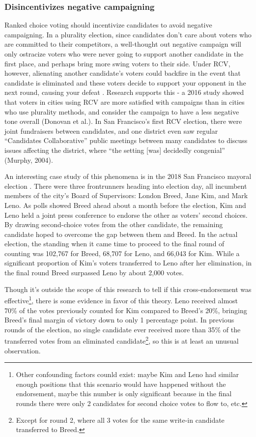 \documentclass[12pt,twoside]{reedthesis}
\theoremstyle{definition}
\theoremstyle{definition}
\theoremstyle{definition}
\theoremstyle{remark}
\begin{document}
\hypertarget{disincentivizes-negative-campaigning}{%
\subsubsection{Disincentivizes negative
campaigning}\label{disincentivizes-negative-campaigning}}

Ranked choice voting should incentivize candidates to avoid negative
campaigning. In a plurality election, since candidates don't care about
voters who are committed to their competitors, a well-thought out
negative campaign will only ostracize voters who were never going to
support another candidate in the first place, and perhaps bring more
swing voters to their side. Under RCV, however, alienating another
candidate's voters could backfire in the event that candidate is
eliminated and these voters decide to support your opponent in the next
round, causing your defeat . Research supports this - a 2016 study
showed that voters in cities using RCV are more satisfied with campaigns
than in cities who use plurality methods, and consider the campaign to
have a less negative tone overall (Donovan et al.). In San Francisco's
first RCV election, there were joint fundraisers between candidates, and
one district even saw regular ``Candidates Collaborative'' public
meetings between many candidates to discuss issues affecting the
district, where ``the setting {[}was{]} decidedly congenial'' (Murphy,
2004).

An interesting case study of this phenomena is in the 2018 San Francisco
mayoral election . There were three frontrunners heading into election
day, all incumbent members of the city's Board of Supervisors: London
Breed, Jane Kim, and Mark Leno. As polls showed Breed ahead about a
month before the election, Kim and Leno held a joint press conference to
endorse the other as voters' second choices. By drawing second-choice
votes from the other candidate, the remaining candidate hoped to
overcome the gap between them and Breed. In the actual election, the
standing when it came time to proceed to the final round of counting was
102,767 for Breed, 68,707 for Leno, and 66,043 for Kim. While a
significant proportion of Kim's voters transferred to Leno after her
elimination, in the final round Breed surpassed Leno by about 2,000
votes.

Though it's outside the scope of this research to tell if this
cross-endorsement was effective\footnote{Other confounding factors
  counld exist: maybe Kim and Leno had similar enough positions that
  this scenario would have happened without the endorsement, maybe this
  number is only significant because in the final rounds there were only
  2 candidates for second choice votes to flow to, etc.}, there is some
evidence in favor of this theory. Leno received almost 70\% of the votes
previously counted for Kim compared to Breed's 20\%, bringing Breed's
final margin of victory down to only 1 percentage point. In previous
rounds of the election, no single candidate ever received more than 35\%
of the transferred votes from an eliminated candidate\footnote{Except
  for round 2, where all 3 votes for the same write-in candidate
  transferred to Breed.}, so this is at least an unusual observation.
\end{document}
